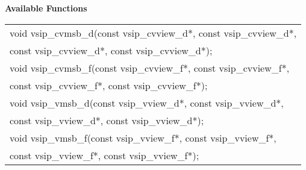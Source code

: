 \\\cvsiplh
\\ \hspace*{.8cm} \vspace*{.1cm} \textbf{Available Functions }
\\ \hspace*{1.1cm} {
\ttfamily
\begin{tabular}[H]{l}
void vsip\_cvmsb\_d(const vsip\_cvview\_d*, const vsip\_cvview\_d*,\\*\hspace{.7cm}const vsip\_cvview\_d*, const vsip\_cvview\_d*);\\
void vsip\_cvmsb\_f(const vsip\_cvview\_f*, const vsip\_cvview\_f*,\\*\hspace{.7cm}const vsip\_cvview\_f*, const vsip\_cvview\_f*); \\
void vsip\_vmsb\_d(const vsip\_vview\_d*, const vsip\_vview\_d*,\\*\hspace{.7cm}const vsip\_vview\_d*, const vsip\_vview\_d*); \\
void vsip\_vmsb\_f(const vsip\_vview\_f*, const vsip\_vview\_f*,\\*\hspace{.7cm}const vsip\_vview\_f*, const vsip\_vview\_f*); \\
\end{tabular}
}
\\\pyjvsiph
{}
